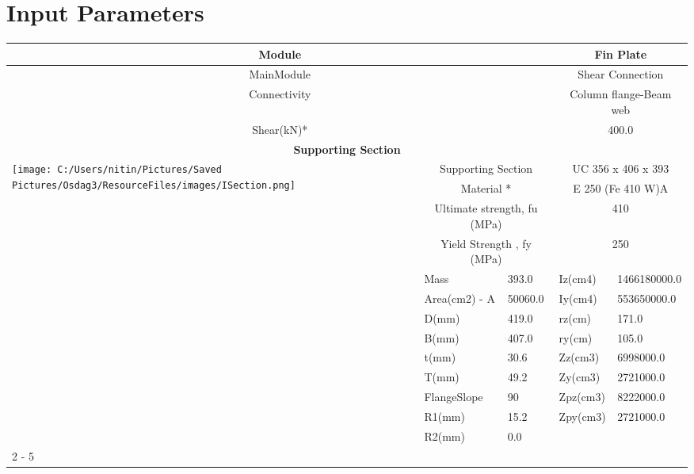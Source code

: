 \documentclass{article}%
\begin{document}
%
\normalsize%
\pagestyle{header}%
\section{Input Parameters}%
\label{sec:InputParameters}%
\renewcommand{\arraystretch}{1.2}%
\begin{longtable}{|p{5cm}|p{2cm}|p{2cm}|p{2cm}|p{5cm}|}%
\hline%
\hline%
\multicolumn{3}{|c|}{Module}&\multicolumn{2}{|c|}{Fin Plate}\\%
\hline%
\hline%
\multicolumn{3}{|c|}{MainModule}&\multicolumn{2}{|c|}{Shear Connection}\\%
\hline%
\hline%
\multicolumn{3}{|c|}{Connectivity}&\multicolumn{2}{|c|}{Column flange{-}Beam web}\\%
\hline%
\hline%
\multicolumn{3}{|c|}{Shear(kN)*}&\multicolumn{2}{|c|}{400.0}\\%
\hline%
\hline%
\multicolumn{5}{|c|}{\textbf{Supporting Section}}\\%
\hline%
\hline%
\multirow{13}{*}{\texttt{[image: C:/Users/nitin/Pictures/Saved Pictures/Osdag3/ResourceFiles/images/ISection.png]}}&\multicolumn{2}{|c|}{Supporting Section}&\multicolumn{2}{|c|}{UC 356 x 406 x 393}\\%
\cline{2%
-%
5}%
&\multicolumn{2}{|c|}{Material *}&\multicolumn{2}{|c|}{E 250 (Fe 410 W)A}\\%
\cline{2%
-%
5}%
&\multicolumn{2}{|c|}{Ultimate strength, fu (MPa)}&\multicolumn{2}{|c|}{410}\\%
\cline{2%
-%
5}%
&\multicolumn{2}{|c|}{Yield Strength , fy (MPa)}&\multicolumn{2}{|c|}{250}\\%
\cline{2%
-%
5}%
&Mass&393.0&Iz(cm4)&1466180000.0\\%
\cline{2%
-%
5}%
&Area(cm2) {-} A&50060.0&Iy(cm4)&553650000.0\\%
\cline{2%
-%
5}%
&D(mm)&419.0&rz(cm)&171.0\\%
\cline{2%
-%
5}%
&B(mm)&407.0&ry(cm)&105.0\\%
\cline{2%
-%
5}%
&t(mm)&30.6&Zz(cm3)&6998000.0\\%
\cline{2%
-%
5}%
&T(mm)&49.2&Zy(cm3)&2721000.0\\%
\cline{2%
-%
5}%
&FlangeSlope&90&Zpz(cm3)&8222000.0\\%
\cline{2%
-%
5}%
&R1(mm)&15.2&Zpy(cm3)&2721000.0\\%
\cline{2%
-%
5}%
&R2(mm)&0.0&&\\%
\cline{2%
-%
5}%
\hline%
\multicolumn{5}{|c|}{\textbf{Supported Section}}\\%

\end{longtable}
\end{document}

